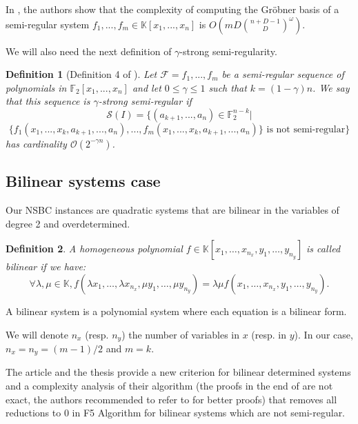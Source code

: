 \documentclass[english]{article}
\newtheorem{definition}{Definition}[section]
\begin{document}
		In \cite{BFS15}, the authors show that the complexity of computing the Gröbner basis of a semi-regular system $f_1,...,f_m \in \mathbb{K}[x_1,...,x_n]$ is $O\left(mD\binom{n+D-1}{D}^\omega \right)$.
		
		
		We will also need the next definition of $\gamma$-strong semi-regularity.
		
		 \begin{definition}[Definition 4 of \cite{VID24}]
			Let $\mathcal{F} = {f_1,...,f_m}$ be a semi-regular sequence of polynomials in $\mathbb{F}_2[x_1,...,x_n]$ and let $0 \leq \gamma \leq 1$ such that $k = (1 - \gamma)n$. We say that this sequence is $\gamma$-strong semi-regular if
			$$
			\mathcal{S}(I) = \{(a_{k+1},...,a_n) \in \mathbb{F}_{2}^{n-k} |
			$$
			$$
			\{f_1(x_1,...,x_k,a_{k+1},...,a_n),...,f_m(x_1,...,x_k,a_{k+1},...,a_n)\} \text{ is not semi-regular}\}
			$$
			has cardinality $\mathcal{O}(2^{-\gamma n})$.
		\end{definition}
		
		\subsection{Bilinear systems case}
		Our NSBC instances are quadratic systems that are bilinear in the variables of degree 2 and overdetermined.
		
		\begin{definition}
			A homogeneous polynomial $f \in \mathbb{K}[x_1,\dots,x_{n_x},y_1,\dots,y_{n_y}]$ is called bilinear if we have:
			$$
				\forall \lambda, \mu \in \mathbb{K}, f(\lambda x_1,\dots,\lambda x_{n_x}, \mu y_1,\dots, \mu y_{n_y}) = \lambda \mu f(x_1,\dots,x_{n_x},y_1,\dots,y_{n_y}).
			$$
		\end{definition}
		
		A bilinear system is a polynomial system where each equation is a bilinear form.
		
		We will denote $n_x$ (resp. $n_y$) the number of variables in $x$ (resp. in $y$). In our case, $n_x = n_y = (m-1)/2$ and $m = k$.
		
		The article \cite{FSS11} and the thesis \cite{Spaen2012} provide a new criterion for bilinear determined systems and a complexity analysis of their algorithm (the proofs in the end of \cite{FSS11} are not exact, the authors recommended to refer to \cite{Spaen2012} for better proofs) that removes all reductions to 0 in F5 Algorithm for bilinear systems which are not semi-regular.
		
\end{document}
